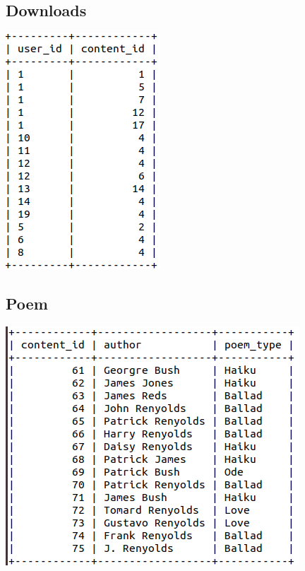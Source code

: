 \documentclass[letter, 12pt, titlepage]{article}
\begin{document}
		\subsection{Downloads}
			\includegraphics[scale=.5]{downloads.png}
		\subsection{Poem}
			\includegraphics[scale=.45]{poem.png}
\end{document}
